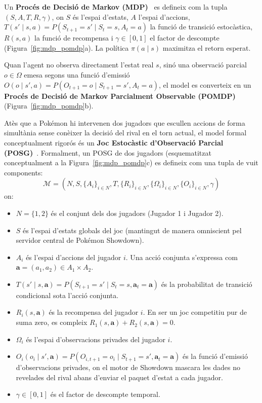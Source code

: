 Un \textbf{Procés de Decisió de Markov (MDP)}~\cite{sutton_barto} es defineix com la tupla $(S,A,T,R,\gamma)$, on $S$ és l'espai d'estats, $A$ l'espai d'accions, $T(s'\mid s,a) = P(S_{t+1}=s'\mid S_t=s, A_t=a)$ la funció de transició estocàstica, $R(s,a)$ la funció de recompensa i $\gamma \in [0,1]$ el factor de descompte (Figura~\ref{fig:mdp_pomdp}a). La política $\pi(a\mid s)$ maximitza el retorn esperat.

Quan l'agent no observa directament l'estat real $s$, sinó una observació parcial $o\in\Omega$ emesa segons una funció d'emissió $O(o\mid s',a) = P(O_{t+1}=o\mid S_{t+1}=s', A_t=a)$, el model es converteix en un \textbf{Procés de Decisió de Markov Parcialment Observable (POMDP)}~\cite{pomdp,kaelbling_pomdp} (Figura~\ref{fig:mdp_pomdp}b).

Atès que a Pokémon hi intervenen dos jugadors que escullen accions de forma simultània sense conèixer la decisió del rival en el torn actual, el model formal conceptualment rigorós és un \textbf{Joc Estocàstic d'Observació Parcial (POSG)}~\cite{shapley_stochastic_games,von_neumann}. Formalment, un POSG de dos jugadors (esquematitzat conceptualment a la Figura~\ref{fig:mdp_pomdp}c) es defineix com una tupla de vuit components:
\begin{equation}
    \mathcal{M} = \left( N, S, \{A_i\}_{i \in N}, T, \{R_i\}_{i \in N}, \{\Omega_i\}_{i \in N}, \{O_i\}_{i \in N}, \gamma \right)
    \label{eq:posg_tuple}
\end{equation}
on:
\begin{itemize}
    \item $N = \{1, 2\}$ és el conjunt dels dos jugadors (Jugador 1 i Jugador 2).
    \item $S$ és l'espai d'estats globals del joc (mantingut de manera omniscient pel servidor central de Pokémon Showdown).
    \item $A_i$ és l'espai d'accions del jugador $i$. Una acció conjunta s'expressa com $\mathbf{a} = (a_1, a_2) \in A_1 \times A_2$.
    \item $T(s'\mid s, \mathbf{a}) = P(S_{t+1}=s'\mid S_t=s, \mathbf{a}_t=\mathbf{a})$ és la probabilitat de transició condicional sota l'acció conjunta.
    \item $R_i(s, \mathbf{a})$ és la recompensa del jugador $i$. En ser un joc competitiu pur de suma zero, es compleix $R_1(s, \mathbf{a}) + R_2(s, \mathbf{a}) = 0$.
    \item $\Omega_i$ és l'espai d'observacions privades del jugador $i$.
    \item $O_i(o_i\mid s', \mathbf{a}) = P(O_{i,t+1}=o_i\mid S_{t+1}=s', \mathbf{a}_t=\mathbf{a})$ és la funció d'emissió d'observacions privades, on el motor de Showdown mascara les dades no revelades del rival abans d'enviar el paquet d'estat a cada jugador.
    \item $\gamma \in [0, 1]$ és el factor de descompte temporal.
\end{itemize}

